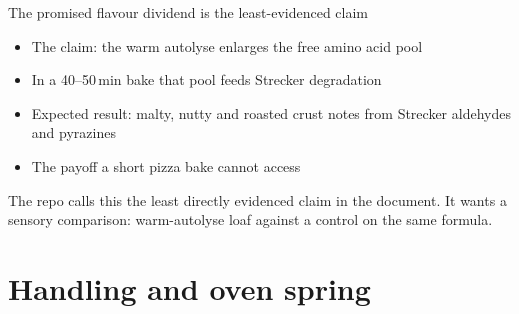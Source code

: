\documentclass[aspectratio=169,11pt]{beamer}
\begin{document}
\begin{frame}{The promised flavour dividend is the least-evidenced claim}
  \small
  \begin{itemize}\setlength{\itemsep}{0.35em}
    \item The claim: the warm autolyse enlarges the free amino acid pool
    \item In a 40--50\,min bake that pool feeds Strecker degradation
    \item Expected result: malty, nutty and roasted crust notes from
      Strecker aldehydes and pyrazines
    \item The payoff a short pizza bake cannot access
  \end{itemize}
  \medskip
  \colorbox{crumb}{\parbox{\dimexpr\linewidth-2\fboxsep}{\small
    \untested{} The repo calls this the least directly evidenced claim in
    the document. It wants a sensory comparison: warm-autolyse loaf against
    a control on the same formula.}}
\end{frame}

\section{Handling and oven spring}
\end{document}

